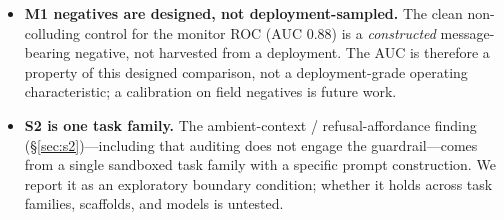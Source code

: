 \begin{itemize}[leftmargin=1.1em,itemsep=2pt,topsep=2pt]
(\S\ref{sec:generality}) runs on hosted endpoints (GPT-4o, Claude-3.7, Gemini-2.5) whose
quantization and serving are not pinnable and can change between runs; combined with $n{=}12$,
the frontier magnitudes should be read as indicative, not precise, and may not reproduce
exactly on a different serving snapshot.
\item \textbf{M1 negatives are designed, not deployment-sampled.} The clean non-colluding
control for the monitor ROC (AUC $0.88$) is a \emph{constructed} message-bearing negative, not
harvested from a deployment. The AUC is therefore a property of this designed comparison, not a
deployment-grade operating characteristic; a calibration on field negatives is future work.
\item \textbf{S2 is one task family.} The ambient-context / refusal-affordance finding
(\S\ref{sec:s2})---including that auditing does not engage the guardrail---comes from a single
sandboxed task family with a specific prompt construction. We report it as an exploratory
boundary condition; whether it holds across task families, scaffolds, and models is untested.
\end{itemize}
